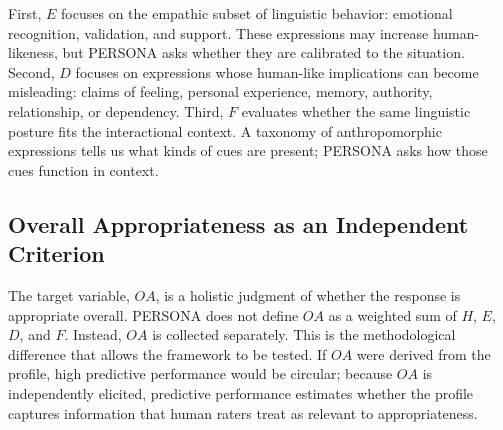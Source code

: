 \documentclass[manuscript,review,anonymous]{acmart}
\begin{document}
First, $E$ focuses on the empathic subset of linguistic behavior: emotional recognition, validation, and support. These expressions may increase human-likeness, but PERSONA asks whether they are calibrated to the situation. Second, $D$ focuses on expressions whose human-like implications can become misleading: claims of feeling, personal experience, memory, authority, relationship, or dependency. Third, $F$ evaluates whether the same linguistic posture fits the interactional context. A taxonomy of anthropomorphic expressions tells us what kinds of cues are present; PERSONA asks how those cues function in context.

\subsection{Overall Appropriateness as an Independent Criterion}
The target variable, $OA$, is a holistic judgment of whether the response is appropriate overall. PERSONA does not define $OA$ as a weighted sum of $H$, $E$, $D$, and $F$. Instead, $OA$ is collected separately. This is the methodological difference that allows the framework to be tested. If $OA$ were derived from the profile, high predictive performance would be circular; because $OA$ is independently elicited, predictive performance estimates whether the profile captures information that human raters treat as relevant to appropriateness.
\end{document}
